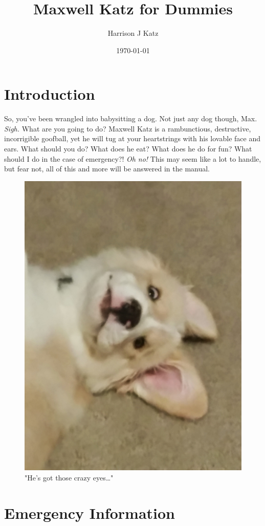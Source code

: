 \documentclass[pdftex,12pt]{article}
\title{Maxwell Katz for Dummies}
\author{Harrison J Katz}
\date{\today}
\begin{document}



\newpage
\tableofcontents

\newpage
\listoffigures

\newpage
{}

\section{Introduction}

So, you've been wrangled into babysitting a dog. Not just any dog though, Max.
\emph{Sigh.} What are you going to do? Maxwell Katz is a rambunctious,
destructive, incorrigible goofball, yet he will tug at your heartstrings with
his lovable face and ears. What should you do? What does he eat? What does he
do for fun? What should I do in the case of emergency?! \emph{Oh no!} This may
seem like a lot to handle, but fear not, all of this and more will be answered
in the manual.

\bigskip

\begin{figure}[h!]
    \centering
    \includegraphics[width=.35\textwidth]{./images/max/crazy_eyes.jpg}
    \caption{"He's got those crazy eyes\ldots"}
    \label{fig:crazy_eyes}
\end{figure}

\newpage
\section{Emergency Information}
\end{document}
